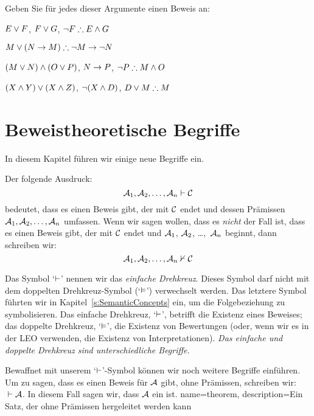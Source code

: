 \problempart 
Geben Sie für jedes dieser Argumente einen Beweis an:
\begin{earg}
\item $E\vee F$, $F\vee G$, $\enot F \therefore E \eand G$
\item $M\eor(N\eif M) \therefore \enot M \eif \enot N$
\item $(M \vee N) \wedge (O \vee P)$, $N \rightarrow P$, $\enot P \therefore M\eand O$
\item $(X\wedge Y)\vee(X\wedge Z)$, $\neg(X\wedge D)$, $D\eor M \therefore M$
\end{earg}



\chapter{Beweistheoretische Begriffe}\label{s:ProofTheoreticConcepts}

In diesem Kapitel führen wir einige neue Begriffe ein.

Der folgende Ausdruck:
$$\mathcal{A}_1, \mathcal{A}_2, \ldots, \mathcal{A}_n \vdash \mathcal{C}$$
bedeutet, dass es einen Beweis gibt, der mit $\mathcal{C}$ endet und dessen Prämissen $\mathcal{A}_1, \mathcal{A}_2, \ldots, \mathcal{A}_n$ umfassen. Wenn wir sagen wollen, dass es \emph{nicht} der Fall ist, dass es einen Beweis gibt, der mit $\mathcal{C}$ endet und $\mathcal{A}_1$, $\mathcal{A}_2$, \dots,~$\mathcal{A}_n$ beginnt, dann schreiben wir: 
$$\mathcal{A}_1, \mathcal{A}_2, \ldots, \mathcal{A}_n \nvdash \mathcal{C}$$ 

Das Symbol `$\vdash$' nennen wir das \emph{einfache Drehkreuz}. Dieses Symbol darf nicht mit dem doppelten Drehkreuz-Symbol (`$\vDash$') verwechselt werden. Das letztere Symbol führten wir in Kapitel~\ref{s:SemanticConcepts} ein, um die Folgebeziehung zu symbolisieren. Das einfache Drehkreuz, `$\vdash$', betrifft die Existenz eines Beweises; das doppelte Drehkreuz, `$\vDash$', die Existenz von Bewertungen (oder, wenn wir es in der LEO verwenden, die Existenz von Interpretationen). \emph{Das einfache und doppelte Drehkreuz sind unterschiedliche Begriffe.}

Bewaffnet mit unserem `$\vdash$'-Symbol können wir noch weitere Begriffe einführen. Um zu sagen, dass es einen Beweis für $\mathcal{A}$ gibt, ohne Prämissen, schreiben wir: ${} \vdash \mathcal{A}$. In diesem Fall sagen wir, dass $\mathcal{A}$ ein  ist.
{
name=theorem,
description={Ein Satz, der ohne Prämissen hergeleitet werden kann}
}

